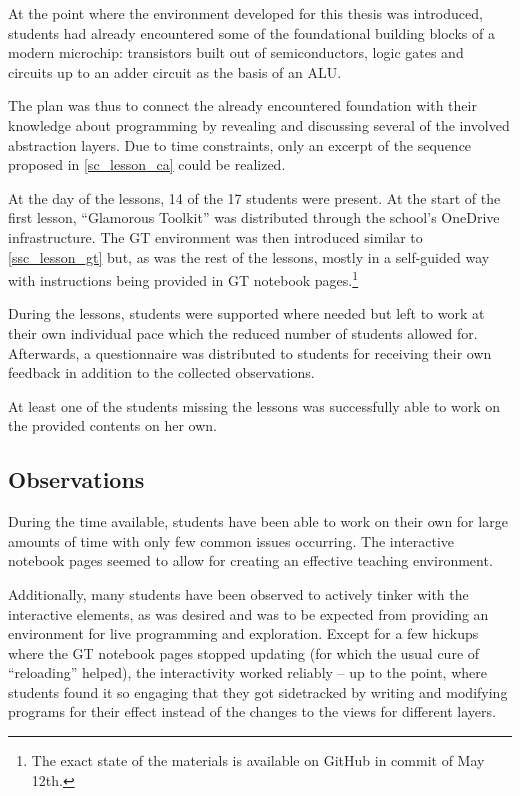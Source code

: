 At the point where the environment developed for this thesis was introduced, students had already encountered some of the foundational building blocks of a modern microchip: transistors built out of semiconductors, logic gates and circuits up to an adder circuit as the basis of an \ac{ALU}.

The plan was thus to connect the already encountered foundation with their knowledge about programming by revealing and discussing several of the involved abstraction layers. Due to time constraints, only an excerpt of the sequence proposed in \ref{sc_lesson_ca} could be realized.

At the day of the lessons, 14 of the 17 students were present. At the start of the first lesson, ``Glamorous Toolkit'' was distributed through the school's OneDrive infrastructure. The \ac{GT} environment was then introduced similar to \ref{ssc_lesson_gt} but, as was the rest of the lessons, mostly in a self-guided way with instructions being provided in \ac{GT} notebook pages.\footnote{The exact state of the materials is available on GitHub \cite{Bue25a} in commit  of May 12th.}

During the lessons, students were supported where needed but left to work at their own individual pace which the reduced number of students allowed for. Afterwards, a questionnaire was distributed to students for receiving their own feedback in addition to the collected observations.

At least one of the students missing the lessons was successfully able to work on the provided contents on her own.


\subsection{Observations}

During the time available, students have been able to work on their own for large amounts of time with only few common issues occurring. The interactive notebook pages seemed to allow for creating an effective teaching environment.

Additionally, many students have been observed to actively tinker with the interactive elements, as was desired and was to be expected from providing an environment for live programming and exploration. Except for a few hickups where the \ac{GT} notebook pages stopped updating (for which the usual cure of ``reloading'' helped), the interactivity worked reliably -- up to the point, where students found it so engaging that they got sidetracked by writing and modifying programs for their effect instead of the changes to the views for different layers.

